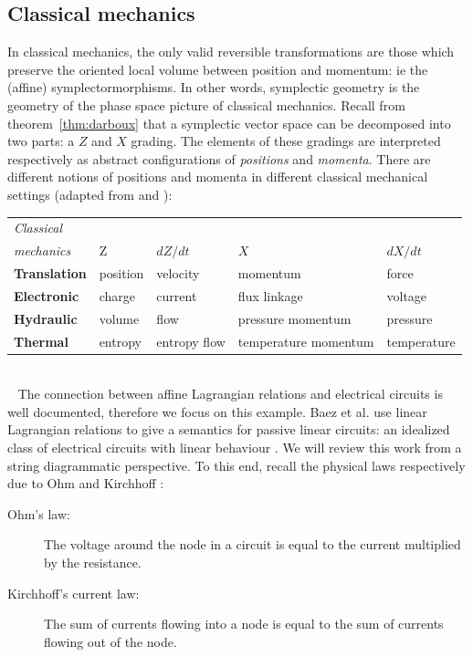 \subsection{Classical mechanics}
\label{subsec:classical}
In classical mechanics, the only valid reversible transformations are those which preserve the oriented local volume between position and momentum: ie the (affine) symplectormorphisms.
In other words, symplectic geometry is the geometry of the phase space picture of classical mechanics.
Recall from theorem~\ref{thm:darboux} that a symplectic vector space can be decomposed into two parts: a \(Z\) and \(X\) grading. The elements of these gradings are interpreted respectively as abstract  configurations of {\em positions} and {\em momenta}. There are different notions of positions and momenta  in different classical mechanical settings (adapted from \textcite[page~23, table~2.1]{bondgraph} and \textcite{thetable}):\\
\hfil
\begin{tabular}{||l|llll||}
\hline
{\it Classical}     		      & 	  &			       &                                         &\\
{\it mechanics}			     & Z        & \({d Z}/{d t}\)   & \(X\)                                  & \({d X}/{d t}\)\\
 \hline
{\bf Translation}                     & position & velocity         & momentum                      & force\\
{\bf Electronic}                      & charge   & current          & flux linkage                      & voltage\\
{\bf Hydraulic}                       & volume  & flow               &  pressure momentum      & pressure\\
{\bf Thermal}                         & entropy & entropy flow  & temperature momentum & temperature\\
\hline
\end{tabular}\\~
The connection between affine Lagrangian relations and electrical circuits is well documented, therefore we focus on this example. Baez et al. use  linear Lagrangian relations to give a semantics for passive linear circuits: an idealized class of electrical circuits with linear behaviour  \cite{passive}.  We will review this work from a string diagrammatic perspective.
To this end, recall the physical laws respectively due to Ohm \cite{ohm} and  Kirchhoff \cite{Kirchhoff1845}:
\begin{description}
\item[Ohm's law:]  The voltage around the node in a circuit is equal to the current multiplied by the resistance.
\item[Kirchhoff's current law:] The sum of currents flowing into a node is equal to the sum of currents flowing out of the node.
\end{description}
